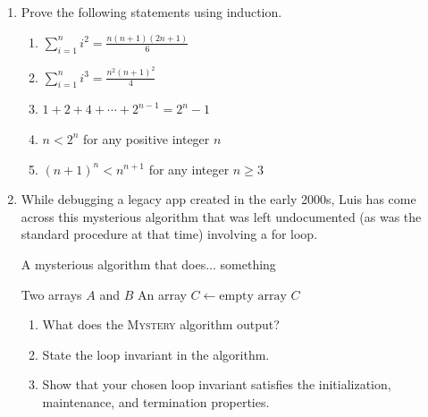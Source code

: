 \begin{exercises}
    \begin{enumerate}
        \item Prove the following statements using induction.
            \begin{enumerate}
                \item $\displaystyle\sum_{i=1}^n i^2 = \frac{n\left(n+1\right)\left(2n+1\right)}{6}$
                \item $\displaystyle\sum_{i=1}^n i^3 = \frac{n^2 \left(n+1\right)^2}{4}$
                \item $1 + 2 + 4 + \cdots + 2^{n-1} = 2^n - 1$
                \item $n < 2^n$ for any positive integer $n$
                \item $\left(n+1\right)^n < n^{n+1}$ for any integer $n \ge 3$
            \end{enumerate}

        \item While debugging a legacy app created in the early 2000s, Luis has come across this mysterious algorithm that was left undocumented (as was the standard procedure at that time) involving a for loop.
            \begin{algorithm}[H]
                \caption{A mysterious algorithm that does... something}
                \begin{algorithmic}[1]
                    \Require Two arrays $A$ and $B$
                    \Ensure An array
                        \State $C \gets \text{empty array}$
                                \State {}
                            \EndIf
                        \EndFor
                        \Return $C$
                    \EndFunction
                \end{algorithmic}
            \end{algorithm}
            
        \begin{enumerate}
            \item What does the \textsc{Mystery} algorithm output?
            \item State the loop invariant in the algorithm.
            \item Show that your chosen loop invariant satisfies the initialization, maintenance, and termination properties.
        \end{enumerate}
                        

\end{enumerate}
\end{exercises}
